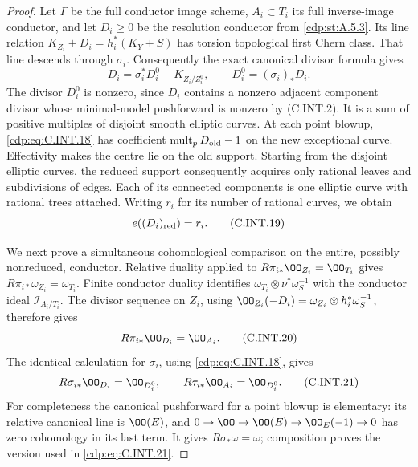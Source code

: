 \begin{proof}
Let $\Gamma$ be the full conductor image scheme,
$A_i\subset T_i$ its full inverse-image conductor,
and let $D_i\ge0$ be the resolution conductor from
\ref{cdp:st:A.5.3}. Its line relation
$K_{Z_i}+D_i=h_i^*(K_Y+S)$ has torsion topological
first Chern class. That line descends through
$\sigma_i$. Consequently the exact canonical
divisor formula gives
\[
 D_i=\sigma_i^*D_i^0-K_{Z_i/Z_i^0},
 \qquad D_i^0=(\sigma_i)_*D_i.
 \tag{C.INT.18}\label{cdp:eq:C.INT.18}
\]
The divisor $D_i^0$ is nonzero, since $D_i$ contains
a nonzero adjacent component divisor whose
minimal-model pushforward is nonzero by (C.INT.2).
It is a sum of positive multiples of disjoint
smooth elliptic curves. At each point blowup,
\eqref{cdp:eq:C.INT.18} has coefficient
$\operatorname{mult}_pD_{\rm old}-1$ on the new
exceptional curve. Effectivity makes the centre
lie on the old support. Starting from the disjoint
elliptic curves, the reduced support consequently
acquires only rational leaves and subdivisions of
edges. Each of its connected components is one
elliptic curve with rational trees attached.
Writing $r_i$ for its number of rational curves,
we obtain
\[
 e((D_i)_{\rm red})=r_i.
 \tag{C.INT.19}\label{cdp:eq:C.INT.19}
\]

We next prove a simultaneous cohomological
comparison on the entire, possibly nonreduced,
conductor. Relative duality applied to
$R\pi_{i*}\OO_{Z_i}=\OO_{T_i}$ gives
$R\pi_{i*}\omega_{Z_i}=\omega_{T_i}$.
Finite conductor duality identifies
$\omega_{T_i}\otimes\nu^*\omega_S^{-1}$ with
the conductor ideal $\mathcal I_{A_i/T_i}$.
The divisor sequence on $Z_i$, using
$\OO_{Z_i}(-D_i)=\omega_{Z_i}\otimes h_i^*\omega_S^{-1}$,
therefore gives
\[
 R\pi_{i*}\OO_{D_i}=\OO_{A_i}.
 \tag{C.INT.20}\label{cdp:eq:C.INT.20}
\]
The identical calculation for $\sigma_i$, using
\eqref{cdp:eq:C.INT.18}, gives
\[
 R\sigma_{i*}\OO_{D_i}=\OO_{D_i^0},
 \qquad R\tau_{i*}\OO_{A_i}=\OO_{D_i^0}.
 \tag{C.INT.21}\label{cdp:eq:C.INT.21}
\]
For completeness the canonical pushforward for a
point blowup is elementary: its relative canonical
line is $\OO(E)$, and
$0\to\OO\to\OO(E)\to\OO_E(-1)\to0$
has zero cohomology in its last term. It gives
$R\sigma_*\omega=\omega$; composition proves the
version used in \eqref{cdp:eq:C.INT.21}.


\end{proof}
